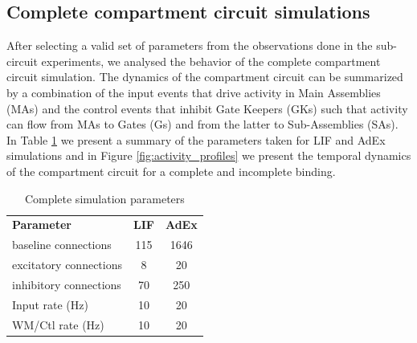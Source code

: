 \documentclass[10pt]{article}
\begin{document}
\subsection{Complete compartment circuit simulations}
{\label{444332}}

After selecting a valid set of parameters from the observations done in the sub-circuit experiments, we analysed the behavior of the complete compartment circuit simulation.
The dynamics of the compartment circuit can be summarized by a combination of the input events that drive activity in Main Assemblies (MAs) and the control events that inhibit Gate Keepers (GKs) such that activity can flow from MAs to Gates (Gs) and from the latter to Sub-Assemblies (SAs).
In Table \ref{table:simulation-parameters} we present a summary of the parameters taken for LIF and AdEx simulations and in Figure \ref{fig:activity_profiles} we present the temporal dynamics of the compartment circuit for a complete and incomplete binding.


\begin{table}[h!]
  \centering \normalsize
  \begin{tabular}{lcc}
    \textbf{Parameter} & \textbf{LIF} & \textbf{AdEx} \\
    baseline connections & 115 & 1646 \\
    excitatory connections & 8 & 20 \\
    inhibitory connections & 70 & 250 \\
    Input rate (Hz) & 10 & 20 \\
    WM/Ctl rate (Hz) & 10 & 20 \\
  \end{tabular}
  \caption{Complete simulation parameters}
  \label{table:simulation-parameters}
\end{table}
\end{document}
